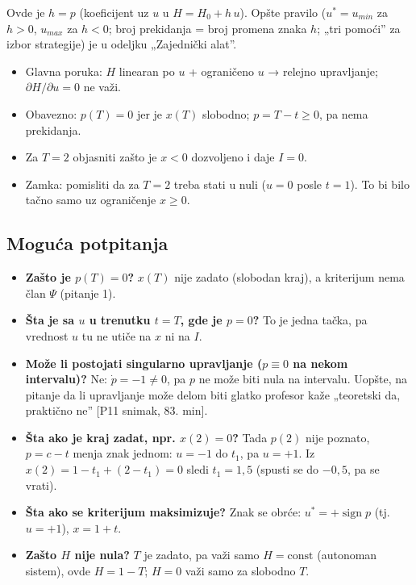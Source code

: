 \documentclass[11pt,a4paper,parskip=half,headsepline,numbers=noenddot]{scrartcl}
\DeclareRobustCommand{\izvor}[1]{{\small\color{izvorC}[#1]}}
\begin{document}
Ovde je \(h = p\) (koeficijent uz \(u\) u \(H = H_0 + h\,u\)). Opšte pravilo (\(u^* = u_{min}\) za \(h > 0\), \(u_{max}\) za \(h < 0\); broj prekidanja = broj promena znaka \(h\); „tri pomoći'' za izbor strategije) je u odeljku „Zajednički alat''.

\begin{ispit}[{Pitanje 7}]
\begin{itemize}
\item Glavna poruka: \(H\) linearan po \(u\) + ograničeno \(u\) → relejno upravljanje; \(\partial H/\partial u = 0\) ne važi.
\item Obavezno: \(p(T) = 0\) jer je \(x(T)\) slobodno; \(p = T - t \ge 0\), pa nema prekidanja.
\item Za \(T = 2\) objasniti zašto je \(x < 0\) dozvoljeno i daje \(I = 0\).
\item Zamka: pomisliti da za \(T = 2\) treba stati u nuli (\(u = 0\) posle \(t = 1\)). To bi bilo tačno samo uz ograničenje \(x \ge 0\).
\end{itemize}
\end{ispit}

\subsection{Moguća potpitanja}

\begin{itemize}
\item \textbf{Zašto je \(p(T) = 0\)?} \(x(T)\) nije zadato (slobodan kraj), a kriterijum nema član \(\Psi\) (pitanje 1).
\item \textbf{Šta je sa \(u\) u trenutku \(t = T\), gde je \(p = 0\)?} To je jedna tačka, pa vrednost \(u\) tu ne utiče na \(x\) ni na \(I\).
\item \textbf{Može li postojati singularno upravljanje (\(p \equiv 0\) na nekom intervalu)?} Ne: \(\dot p = -1 \ne 0\), pa \(p\) ne može biti nula na intervalu. Uopšte, na pitanje da li upravljanje može delom biti glatko profesor kaže „teoretski da, praktično ne'' \izvor{P11 snimak, 83. min}.
\item \textbf{Šta ako je kraj zadat, npr. \(x(2) = 0\)?} Tada \(p(2)\) nije poznato, \(p = c - t\) menja znak jednom: \(u = -1\) do \(t_1\), pa \(u = +1\). Iz \(x(2) = 1 - t_1 + (2 - t_1) = 0\) sledi \(t_1 = 1{,}5\) (spusti se do \(-0{,}5\), pa se vrati).
\item \textbf{Šta ako se kriterijum maksimizuje?} Znak se obrće: \(u^* = +\operatorname{sign} p\) (tj. \(u = +1\)), \(x = 1 + t\).
\item \textbf{Zašto \(H\) nije nula?} \(T\) je zadato, pa važi samo \(H = \text{const}\) (autonoman sistem), ovde \(H = 1 - T\); \(H = 0\) važi samo za slobodno \(T\).
\end{itemize}
\end{document}
